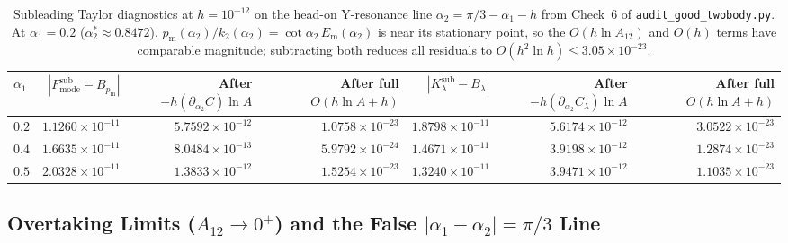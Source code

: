 \documentclass[11pt,a4paper]{article}
\begin{document}
\begin{table}[htbp]
\centering
\small
\begin{tabular}{@{}lrrrrrr@{}}
\toprule
$\alpha_1$ & $|F_{\mathrm{mode}}^{\mathrm{sub}} - B_{p_{\mathrm{m}}}|$ & After $-h(\partial_{\alpha_2}C)\ln A$ & After full $O(h\ln A + h)$ & $|K_\lambda^{\mathrm{sub}} - B_\lambda|$ & After $-h(\partial_{\alpha_2}C_\lambda)\ln A$ & After full $O(h\ln A + h)$ \\
\midrule
$0.2$ & $1.1260\times 10^{-11}$ & $5.7592\times 10^{-12}$ & $1.0758\times 10^{-23}$ & $1.8798\times 10^{-11}$ & $5.6174\times 10^{-12}$ & $3.0522\times 10^{-23}$ \\
$0.4$ & $1.6635\times 10^{-11}$ & $8.0484\times 10^{-13}$ & $5.9792\times 10^{-24}$ & $1.4671\times 10^{-11}$ & $3.9198\times 10^{-12}$ & $1.2874\times 10^{-23}$ \\
$0.5$ & $2.0328\times 10^{-11}$ & $1.3833\times 10^{-12}$ & $1.5254\times 10^{-23}$ & $1.3240\times 10^{-11}$ & $3.9471\times 10^{-12}$ & $1.1035\times 10^{-23}$ \\
\bottomrule
\end{tabular}
\caption{Subleading Taylor diagnostics at $h=10^{-12}$ on the head-on Y-resonance line $\alpha_2 = \pi/3 - \alpha_1 - h$ from Check~6 of \texttt{audit\_good\_twobody.py}. At $\alpha_1=0.2$ ($\alpha_2^*\approx 0.8472$), $p_{\mathrm{m}}(\alpha_2)/k_2(\alpha_2) = \cot\alpha_2\,E_{\mathrm{m}}(\alpha_2)$ is near its stationary point, so the $O(h\ln A_{12})$ and $O(h)$ terms have comparable magnitude; subtracting both reduces all residuals to $O(h^2\ln h) \le 3.05\times 10^{-23}$.}
\label{tab:headon_hlogh}
\end{table}

\subsection{Overtaking Limits ($A_{12} \to 0^+$) and the False $|\alpha_1-\alpha_2|=\pi/3$ Line}
\end{document}
